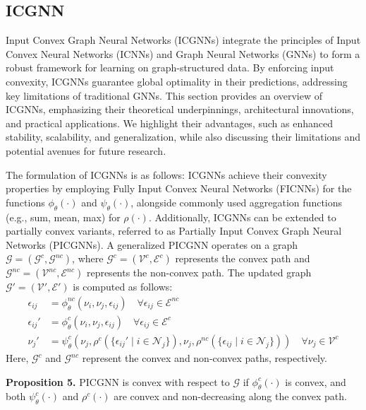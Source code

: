 \documentclass{article} %
\begin{document}
\subsection{ICGNN}
Input Convex Graph Neural Networks (ICGNNs) integrate the principles of Input Convex Neural Networks (ICNNs) and Graph Neural Networks (GNNs) to form a robust framework for learning on graph-structured data. By enforcing input convexity, ICGNNs guarantee global optimality in their predictions, addressing key limitations of traditional GNNs. This section provides an overview of ICGNNs, emphasizing their theoretical underpinnings, architectural innovations, and practical applications. We highlight their advantages, such as enhanced stability, scalability, and generalization, while also discussing their limitations and potential avenues for future research.

The formulation of ICGNNs is as follows:
ICGNNs achieve their convexity properties by employing Fully Input Convex Neural Networks (FICNNs) for the functions $\phi_\theta(\cdot)$ and $\psi_\theta(\cdot)$, alongside commonly used aggregation functions (e.g., sum, mean, max) for $\rho(\cdot)$. Additionally, ICGNNs can be extended to partially convex variants, referred to as Partially Input Convex Graph Neural Networks (PICGNNs). A generalized PICGNN operates on a graph $\mathcal{G} = (\mathcal{G}^c, \mathcal{G}^{nc})$, where $\mathcal{G}^c = (\mathcal{V}^c, \mathcal{E}^c)$ represents the convex path and $\mathcal{G}^{nc} = (\mathcal{V}^{nc}, \mathcal{E}^{nc})$ represents the non-convex path. The updated graph $\mathcal{G}' = (\mathcal{V}', \mathcal{E}')$ is computed as follows:
\begin{align}
   \epsilon_{ij} &= \phi_\theta^{nc}(\nu_i, \nu_j, \epsilon_{ij}) \quad \forall \epsilon_{ij} \in \mathcal{E}^{nc} \tag{10} \\
   \epsilon_{ij}' &= \phi_\theta^c(\nu_i, \nu_j, \epsilon_{ij}) \quad \forall \epsilon_{ij} \in \mathcal{E}^c \tag{11} \\
   \nu_j' &= \psi_\theta^c\left(\nu_j, \rho^c\left(\{\epsilon_{ij}' \mid i \in \mathcal{N}_j\}\right), \nu_j, \rho^{nc}\left(\{\epsilon_{ij} \mid i \in \mathcal{N}_j\}\right)\right) \quad \forall \nu_j \in \mathcal{V}^c \tag{12}
\end{align}
Here, $\mathcal{G}^c$ and $\mathcal{G}^{nc}$ represent the convex and non-convex paths, respectively.

\textbf{Proposition 5.} PICGNN is convex with respect to $\mathcal{G}$ if $\phi_\theta^c(\cdot)$ is convex, and both $\psi_\theta^c(\cdot)$ and $\rho^c(\cdot)$ are convex and non-decreasing along the convex path.
\end{document}
